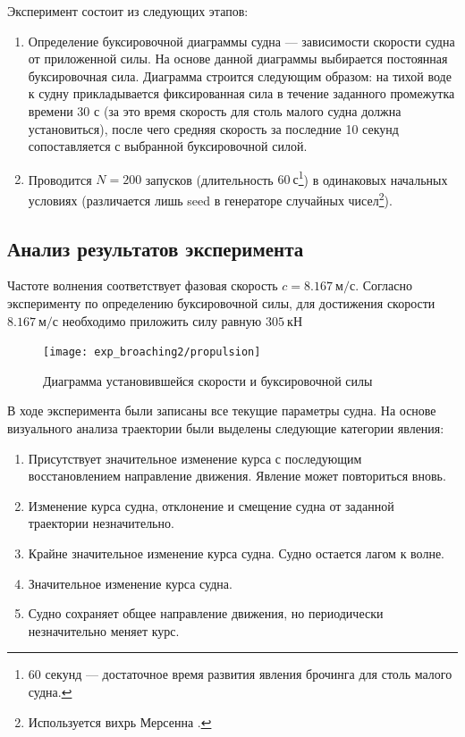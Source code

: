 Эксперимент состоит из следующих этапов:
\begin{enumerate}
	\item	Определение буксировочной диаграммы судна --- зависимости скорости судна от приложенной силы. 
			На основе данной диаграммы выбирается постоянная буксировочная сила. 
			Диаграмма строится следующим образом: на тихой воде к судну прикладывается фиксированная 
			сила в течение заданного промежутка времени 30 с 
			(за это время скорость для столь малого судна 
			должна установиться), после чего средняя скорость за последние 10 секунд 
			сопоставляется с выбранной буксировочной силой.
	\item	Проводится $N=200$ запусков (длительность $60\ \text{с}$\footnote{60 секунд --- достаточное время развития явления брочинга для столь малого судна.}) в одинаковых начальных условиях (различается лишь seed в генераторе случайных чисел\footnote{Используется вихрь Мерсенна \citep{mersenn_twister}.}).
\end{enumerate}



\subsection{Анализ результатов эксперимента}

Частоте волнения соответствует фазовая скорость $c = 8.167\ \text{м/с}$.
Согласно эксперименту по определению буксировочной силы, для достижения скорости $8.167\ \text{м/с}$ необходимо приложить силу равную $305\ \text{кН}$

\begin{figure}[ht]
	\begin{center}
	\texttt{[image: exp\_broaching2/propulsion]}
	\end{center}
	\caption{Диаграмма установившейся скорости и буксировочной силы}
	\label{tug_force}
\end{figure}

В ходе эксперимента были записаны все текущие параметры судна. На основе визуального анализа траектории были выделены следующие категории явления:

\begin{enumerate}
	\item	Присутствует значительное изменение курса с последующим восстановлением направление движения. 
			Явление может повториться вновь.
	\item	Изменение курса судна, отклонение и смещение судна от заданной траектории незначительно.
	\item	Крайне значительное изменение курса судна. Судно остается лагом к волне.
	\item	Значительное изменение курса судна.
	\item	Судно сохраняет общее направление движения, но периодически незначительно меняет курс.
\end{enumerate}

